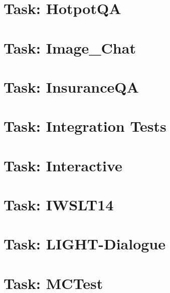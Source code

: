 \documentclass[twoside]{book}
\newcommand{\+}{\discretionary{\mbox{\scriptsize$\hookleftarrow$}}{}{}}
\begin{document}
\chapter{Task\+: Hotpot\+QA}
\label{md_parlai_tasks_hotpotqa_README}

\chapter{Task\+: Image\+\_\+\+Chat}
\label{md_parlai_tasks_image_chat_README}

\chapter{Task\+: Insurance\+QA}
\label{md_parlai_tasks_insuranceqa_README}

\chapter{Task\+: Integration Tests}
\label{md_parlai_tasks_integration_tests_README}

\chapter{Task\+: Interactive}
\label{md_parlai_tasks_interactive_README}

\chapter{Task\+: I\+W\+S\+L\+T14}
\label{md_parlai_tasks_iwslt14_README}

\chapter{Task\+: L\+I\+G\+H\+T-\/\+Dialogue}
\label{md_parlai_tasks_light_dialog_README}

\chapter{Task\+: M\+C\+Test}
\label{md_parlai_tasks_mctest_README}

\end{document}

